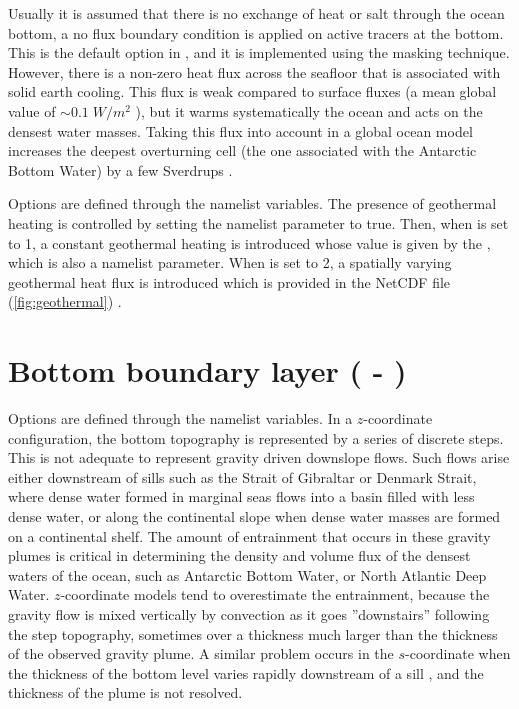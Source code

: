 \documentclass[../main/NEMO_manual]{subfiles}
\begin{document}
Usually it is assumed that there is no exchange of heat or salt through the ocean bottom,
\ie a no flux boundary condition is applied on active tracers at the bottom.
This is the default option in \NEMO, and it is implemented using the masking technique.
However, there is a non-zero heat flux across the seafloor that is associated with solid earth cooling.
This flux is weak compared to surface fluxes (a mean global value of $\sim0.1\;W/m^2$ \citep{Stein_Stein_Nat92}),
but it warms systematically the ocean and acts on the densest water masses.
Taking this flux into account in a global ocean model increases the deepest overturning cell
(\ie the one associated with the Antarctic Bottom Water) by a few Sverdrups  \citep{Emile-Geay_Madec_OS09}. 

Options are defined through the   namelist variables.
The presence of geothermal heating is controlled by setting the namelist parameter  to true.
Then, when  is set to 1, a constant geothermal heating is introduced whose value is given by
the , which is also a namelist parameter.
When  is set to 2, a spatially varying geothermal heat flux is introduced which is provided in
the  NetCDF file (\autoref{fig:geothermal}) \citep{Emile-Geay_Madec_OS09}.

\section{Bottom boundary layer (\protect{} - \protect{})}
\label{sec:TRA_bbl}


Options are defined through the   namelist variables.
In a $z$-coordinate configuration, the bottom topography is represented by a series of discrete steps.
This is not adequate to represent gravity driven downslope flows.
Such flows arise either downstream of sills such as the Strait of Gibraltar or Denmark Strait,
where dense water formed in marginal seas flows into a basin filled with less dense water,
or along the continental slope when dense water masses are formed on a continental shelf.
The amount of entrainment that occurs in these gravity plumes is critical in determining the density and
volume flux of the densest waters of the ocean, such as Antarctic Bottom Water, or North Atlantic Deep Water.
$z$-coordinate models tend to overestimate the entrainment,
because the gravity flow is mixed vertically by convection as it goes ''downstairs'' following the step topography,
sometimes over a thickness much larger than the thickness of the observed gravity plume.
A similar problem occurs in the $s$-coordinate when the thickness of the bottom level varies rapidly downstream of
a sill \citep{Willebrand_al_PO01}, and the thickness of the plume is not resolved. 
\end{document}
